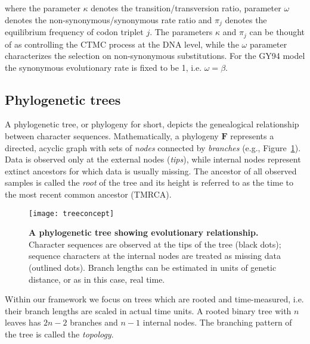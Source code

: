 \noindent
where the parameter $\kappa$ denotes the transition/transversion ratio, parameter $\omega$ denotes the non-synonymous/synonymous
rate ratio and $\pi_j$ denotes the equilibrium frequency of codon triplet $j$.
The parameters $\kappa$ and $\pi_j$ can be thought of as controlling the CTMC process at the DNA level, while the $\omega$ parameter characterizes the selection on non-synonymous substitutions.
For the GY94 model the synonymous evolutionary rate is fixed to be 1, i.e. $\omega=\beta$.

\subsection{Phylogenetic trees}


A phylogenetic tree, or phylogeny for short, depicts the genealogical relationship between character sequences.
Mathematically, a phylogeny $\mathbf{F}$ represents a directed, acyclic graph with sets of \emph{nodes} connected by \emph{branches} (e.g., Figure~\ref{fig:treeconcept}).
Data is observed only at the external nodes (\emph{tips}), while internal nodes represent extinct ancestors for which data is usually missing.
The ancestor of all observed samples is called the \emph{root} of the tree and its height is referred to as the time to the most recent common ancestor (TMRCA).

\begin{figure}[h!]
\centering
\texttt{[image: treeconcept]} 
\caption{
{ \footnotesize 
{\bf A phylogenetic tree showing evolutionary relationship.} Character sequences are observed at the tips of the tree (black dots); sequence characters at the internal nodes are treated as missing data (outlined dots). 
Branch lengths can be estimated in units of genetic distance, or as in this case, real time.
} %
}
\label{fig:treeconcept}
\end{figure}

Within our framework we focus on trees which are rooted and time-measured, i.e. their branch lengths are scaled in actual time units.
A rooted binary tree with $n$ leaves has $2n-2$ branches and $n-1$ internal nodes.
The branching pattern of the tree is called the \emph{topology}. 

